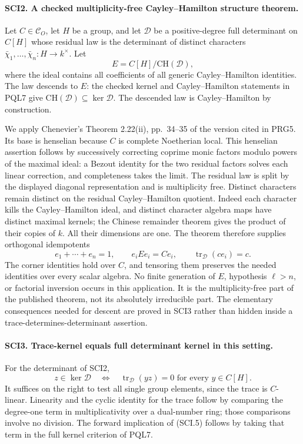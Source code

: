 \paragraph{SCI2. A checked multiplicity-free Cayley--Hamilton structure theorem.}
\label{claim:SCI2}
Let \(C\in\mathcal C_O\), let \(H\) be a group, and let
\(\mathcal D\) be a positive-degree full determinant on
\(C[H]\) whose residual law is the determinant of distinct
characters \(\bar\chi_1,\ldots,\bar\chi_n:H\to k^\times\).
Let
\[
 E=C[H]/\mathrm{CH}(\mathcal D),                           \tag{SCI.3}
\]
where the ideal contains all coefficients of all generic
Cayley--Hamilton identities. The law descends to \(E\): the
checked kernel and Cayley--Hamilton statements in PQL7 give
\(\mathrm{CH}(\mathcal D)\subseteq\ker\mathcal D\).
The descended law is Cayley--Hamilton by construction.

We apply Chenevier's Theorem 2.22(ii), pp.~34--35 of the version
cited in PRG5. Its base is henselian because \(C\) is complete
Noetherian local. This henselian assertion follows by successively
correcting coprime monic factors modulo powers of the maximal
ideal: a Bezout identity for the two residual factors solves
each linear correction, and completeness takes the limit.
The residual law is split by the displayed diagonal representation
and is multiplicity free. Distinct characters remain distinct on
the residual Cayley--Hamilton quotient. Indeed each character
kills the Cayley--Hamilton ideal, and distinct character algebra
maps have distinct maximal kernels; the Chinese remainder theorem
gives the product of their copies of \(k\). All their dimensions
are one. The theorem therefore supplies orthogonal idempotents
\[
 e_1+\cdots+e_n=1,\qquad e_iEe_i=Ce_i,\qquad
 \operatorname{tr}_{\mathcal D}(c e_i)=c.                 \tag{SCI.4}
\]
The corner identities hold over \(C\), and tensoring them
preserves the needed identities over every scalar algebra.
No finite generation of \(E\), hypothesis \(\ell>n\), or
factorial inversion occurs in this application. It is the
multiplicity-free part of the published theorem, not its
absolutely irreducible part. The elementary consequences needed
for descent are proved in SCI3 rather than hidden inside a
trace-determines-determinant assertion.

\paragraph{SCI3. Trace-kernel equals full determinant kernel in this setting.}
\label{claim:SCI3}
For the determinant of SCI2,
\[
 z\in\ker\mathcal D
   \quad\Longleftrightarrow\quad
 \operatorname{tr}_{\mathcal D}(y z)=0
          \text{ for every }y\in C[H].                    \tag{SCI.5}
\]
It suffices on the right to test all single group elements,
since the trace is \(C\)-linear. Linearity and the cyclic
identity for the trace follow by comparing the degree-one term
in multiplicativity over a dual-number ring; those comparisons
involve no division. The forward implication of (SCI.5) follows
by taking that term in the full kernel criterion of PQL7.


